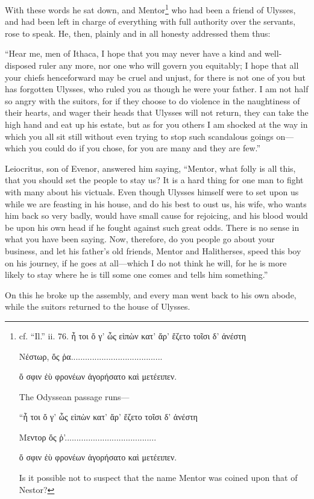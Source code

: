 With these words he sat down, and Mentor\footnote{cf. “Il.” ii. 76. ἦ τοι ὄ γ’ ὦς
εὶπὼν κατ’ ἄρ’
ἔζετο τοῖσι δ’
ἀνέστη

Νέστωρ, ὄς
ῥα.......................................

ὄ σφιν ἐὺ
φρονέων
ἀγορήσατο καὶ
μετέειπεν.

The Odyssean passage runs—

“ἦ τοι ὄ γ’ ὦς
εὶπὼν κατ’ ἄρ’
ἔζετο τοῖσι δ’
ἀνέστη

Μεντορ ὄς
ῥ’.......................................

ὄ σφιν ἐὺ
φρονέων
ἀγορήσατο καὶ
μετέειπεν.

Is it possible not to suspect that the name Mentor was coined upon that of
Nestor?} who had been a friend of Ulysses, and
had been left in charge of everything with full authority over the servants,
rose to speak. He, then, plainly and in all honesty addressed them thus:

“Hear me, men of Ithaca, I hope that you may never have a kind and
well-disposed ruler any more, nor one who will govern you equitably; I hope
that all your chiefs henceforward may be cruel and unjust, for there is not one
of you but has forgotten Ulysses, who ruled you as though he were your father.
I am not half so angry with the suitors, for if they choose to do violence in
the naughtiness of their hearts, and wager their heads that Ulysses will not
return, they can take the high hand and eat up his estate, but as for you
others I am shocked at the way in which you all sit still without even trying
to stop such scandalous goings on—which you could do if you chose, for you are
many and they are few.”

Leiocritus, son of Evenor, answered him saying, “Mentor, what folly is all
this, that you should set the people to stay us? It is a hard thing for one man
to fight with many about his victuals. Even though Ulysses himself were to set
upon us while we are feasting in his house, and do his best to oust us, his
wife, who wants him back so very badly, would have small cause for rejoicing,
and his blood would be upon his own head if he fought against such great odds.
There is no sense in what you have been saying. Now, therefore, do you people
go about your business, and let his father’s old friends, Mentor and
Halitherses, speed this boy on his journey, if he goes at all—which I do not
think he will, for he is more likely to stay where he is till some one comes
and tells him something.”

On this he broke up the assembly, and every man went back to his own abode,
while the suitors returned to the house of Ulysses.

